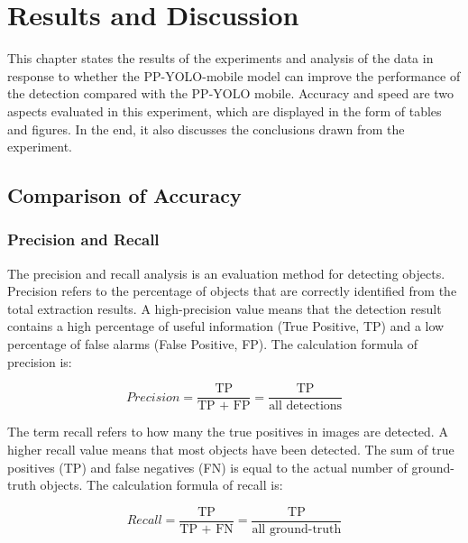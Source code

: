 \documentclass[journal,article,submit,moreauthors,pdftex]{Definitions/mdpi}
\begin{document}
\section{Results and Discussion}
This chapter states the results of the experiments and analysis of the data in response to whether the PP-YOLO-mobile model can improve the performance of the detection compared with the PP-YOLO mobile. Accuracy and speed are two aspects evaluated in this experiment, which are displayed in the form of tables and figures. In the end, it also discusses the conclusions drawn from the experiment.

\subsection{Comparison of Accuracy}

\subsubsection{Precision and Recall}

The precision and recall analysis is an evaluation method for detecting objects. Precision refers to the percentage of objects that are correctly identified from the total extraction results. A high-precision value means that the detection result contains a high percentage of useful information (True Positive, TP) and a low percentage of false alarms (False Positive, FP). The calculation formula of precision is:


\begin{equation} 
Precision = \frac{\text{TP}}{\text{TP + FP} } = \frac{\text{TP}}{\text{all\ detections} }
\end{equation}

The term recall refers to how many the true positives in images are detected. A higher recall value means that most objects have been detected. The sum of true positives (TP) and false negatives (FN) is equal to the actual number of ground-truth objects. The calculation formula of recall is:

\begin{equation} 
Recall = \frac{\text{TP}}{\text{TP + FN} } = \frac{\text{TP}}{\text{all\ ground-truth} } 
\end{equation}
\end{document}
